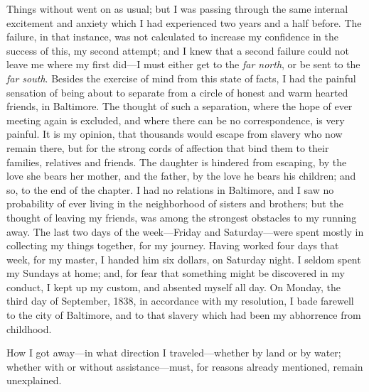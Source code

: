 Things without went on as usual; but I was passing through the same
internal excitement and anxiety which I had experienced two years and a
half before. The failure, in that instance, was not calculated to
increase my confidence in the success of this, my second attempt; and I
knew that a second failure could not leave me where my first did---I
must either get to the \emph{far north}, or be sent to the \emph{far
south}. Besides the exercise of mind from this state of facts, I had the
painful sensation of being about to separate from a circle of honest and
warm hearted friends, in Baltimore. The thought of such a separation,
where the hope of ever meeting again is excluded, and where there can be
no correspondence, is very painful. It is my opinion, that thousands
would escape from slavery who now remain there, but for the strong cords
of affection that bind them to their families, relatives and friends.
The daughter is hindered from escaping, by the love she bears her
mother, and the father, by the love he bears his children; and so, to
the end of the chapter. I had no relations in Baltimore, and I saw no
probability of ever living in the {}neighborhood of sisters and
brothers; but the thought of leaving my friends, was among the strongest
obstacles to my running away. The last two days of the week---Friday and
Saturday---were spent mostly in collecting my things together, for my
journey. Having worked four days that week, for my master, I handed him
six dollars, on Saturday night. I seldom spent my Sundays at home; and,
for fear that something might be discovered in my conduct, I kept up my
custom, and absented myself all day. On Monday, the third day of
September, 1838, in accordance with my resolution, I bade farewell to
the city of Baltimore, and to that slavery which had been my abhorrence
from childhood.

How I got away---in what direction I traveled---whether by land or by
water; whether with or without assistance---must, for reasons already
mentioned, remain unexplained.
